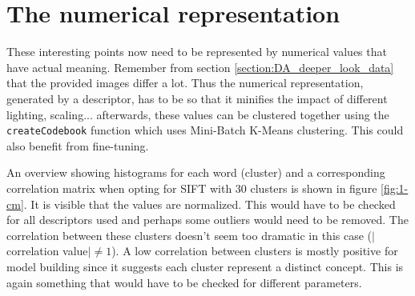 
\section{The numerical representation}
\label{section:DA_numerical_representation}

These interesting points now need to be represented by numerical values that have actual meaning.
Remember from section \ref{section:DA_deeper_look_data} that the provided images differ a lot.
Thus the numerical representation, generated by a descriptor, has to be so that it minifies the impact of different lighting, scaling...
afterwards, these values can be clustered together using the \texttt{createCodebook} function which uses Mini-Batch K-Means clustering.
This could also benefit from fine-tuning.

An overview showing histograms for each word (cluster) and a corresponding correlation matrix when opting for SIFT with 30 clusters is shown in figure \ref{fig:1-cm}.
It is visible that the values are normalized.
This would have to be checked for all descriptors used and perhaps some outliers would need to be removed.
The correlation between these clusters doesn't seem too dramatic in this case ($|$correlation value$| \neq 1 $).
A low correlation between clusters is mostly positive for model building since it suggests each cluster represent a distinct concept.
This is again something that would have to be checked for different parameters.

